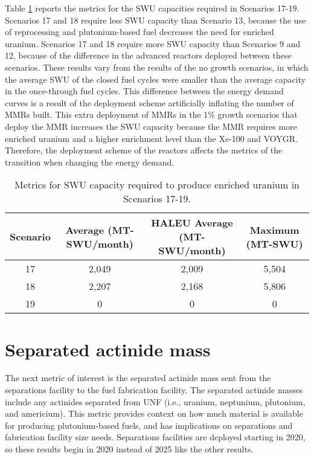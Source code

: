 Table \ref{tab:s17-19_swu} reports the metrics for the \gls{SWU} capacities 
required in Scenarios 17-19. Scenarios 17 and 18 require less 
\gls{SWU} capacity than Scenario 13, because the use of 
reprocessing and plutonium-based fuel decreases the need for 
enriched uranium. Scenarios 17 and 18 require more \gls{SWU} 
capacity than Scenarios 9 and 12, because of the difference in 
the advanced reactors deployed between these scenarios. These results 
vary from the results of the no growth scenarios, in which the 
average \gls{SWU} of the closed fuel cycles were smaller than the 
average capacity in the once-through fuel cycles. This difference 
between the energy demand curves is a result of the deployment 
scheme artificially inflating the number of \glspl{MMR} built. This 
extra deployment of \glspl{MMR} in the 1\% growth scenarios that 
deploy the \gls{MMR} increases the \gls{SWU} capacity because the 
\gls{MMR} requires more enriched uranium and a higher enrichment 
level than the Xe-100 and VOYGR. Therefore, the deployment scheme 
of the reactors affects the metrics of the transition when changing 
the energy demand. 

\begin{table}[h!]
    \centering 
    \caption{Metrics for \gls{SWU} capacity required to produce 
    enriched uranium in Scenarios 17-19.}
    \label{tab:s17-19_swu}
    \begin{tabular}{c c c c}
        \hline 
        Scenario & Average (MT-SWU/month) & HALEU Average (MT-SWU/month)
         & Maximum (MT-SWU) \\
        \hline 
        17 & 2,049 & 2,009 & 5,504 \\
        18 & 2,207 & 2,168 & 5,806 \\
        19 & 0 & 0 & 0 \\
        \hline
        
    \end{tabular}
\end{table}

\section{Separated actinide mass}
The next metric of interest is the separated actinide mass sent 
from the separations facility to the fuel fabrication facility. 
The separated actinide masses include any actinides separated 
from \gls{UNF} (i.e., uranium, neptunium, plutonium, and 
americium). 
This metric provides context on how much material is available for 
producing plutonium-based fuels, and has implications on 
separations and fabrication facility size needs. Separations facilities 
are deployed starting in 2020, so these results begin in 2020 instead 
of 2025 like the other results. 

